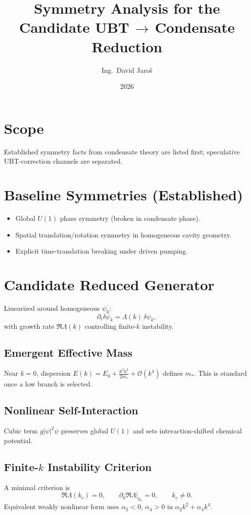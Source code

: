 \documentclass[11pt,a4paper]{article}
\title{Symmetry Analysis for the Candidate UBT\,$\to$\,Condensate Reduction}
\author{Ing.\ David Jaroš}
\date{2026}
\begin{document}
\maketitle

\section*{Scope}
Established symmetry facts from condensate theory are listed first; speculative UBT-correction channels are separated.

\section{Baseline Symmetries (Established)}
\begin{itemize}
\item Global $U(1)$ phase symmetry (broken in condensate phase).
\item Spatial translation/rotation symmetry in homogeneous cavity geometry.
\item Explicit time-translation breaking under driven pumping.
\end{itemize}

\section{Candidate Reduced Generator}
Linearized around homogeneous $\psi_0$:
\begin{equation}
\partial_t\delta\psi_k=\Lambda(k)\,\delta\psi_k,
\end{equation}
with growth rate $\Re\Lambda(k)$ controlling finite-$k$ instability.

\subsection{Emergent Effective Mass}
Near $k=0$, dispersion $E(k)=E_0+\frac{\hbar^2k^2}{2m_*}+\mathcal O(k^4)$ defines $m_*$. This is standard once a low branch is selected.

\subsection{Nonlinear Self-Interaction}
Cubic term $g|\psi|^2\psi$ preserves global $U(1)$ and sets interaction-shifted chemical potential.

\subsection{Finite-$k$ Instability Criterion}
A minimal criterion is
\begin{equation}
\Re\Lambda(k_c)=0,\qquad \partial_k\Re\Lambda|_{k_c}=0,\qquad k_c\neq0.
\end{equation}
Equivalent weakly nonlinear form uses $\alpha_2<0$, $\alpha_4>0$ in $\alpha_2k^2+\alpha_4k^4$.
\end{document}
